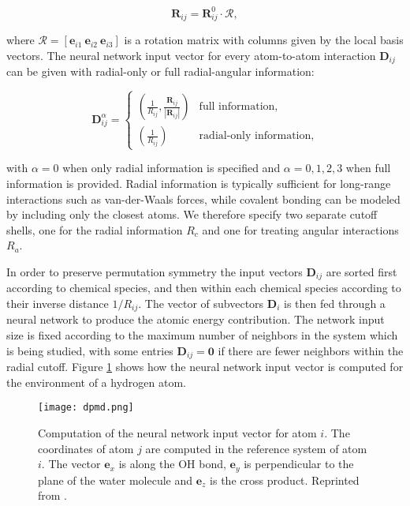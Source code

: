 \begin{equation}
    \bm{R}_{ij} = \bm{R}_{ij}^0 \cdot \mathcal{R} ,
\end{equation}

where $\mathcal{R} = [\bm{e}_{i1} \ \bm{e}_{i2} \ \bm{e}_{i3}]$
is a rotation matrix with columns given by the local basis vectors.
The neural network input vector for every atom-to-atom interaction
$\bm{D}_{ij}$ can be given with radial-only or full radial-angular
information:

\begin{equation}
    \bm{D}_{ij}^{\alpha} =
\begin{cases}
    \displaystyle\left( \frac{1}{R_{ij}}, \frac{\bm{R}_{ij}}{\left| \bm{R}_{ij} \right|}
    \right) & \text{full information}, \\[10pt]
    \displaystyle\left( \frac{1}{R_{ij}} \right) & \text{radial-only information},
\end{cases}
\end{equation}

with $\alpha = 0$ when only radial information is specified
and $\alpha = 0,1,2,3$ when full information is provided. Radial information
is typically sufficient for long-range interactions such as van-der-Waals
forces, while covalent bonding can be modeled by including
only the closest atoms. We therefore specify two separate
cutoff shells, one for the radial information $R_c$ and one
for treating angular interactions $R_a$.
\par
In order to preserve permutation symmetry the input vectors $\bm{D}_{ij}$
are sorted first according to chemical species, and then within
each chemical species according to their inverse distance $1 / R_{ij}$.
The vector of subvectors $\bm{D}_i$ is then fed through a neural
network to produce the atomic energy contribution.
The network input size is fixed according to the maximum number of neighbors
in the system which is being studied, with some entries $\bm{D}_{ij} = \bm{0}$
if there are fewer neighbors within the radial cutoff.
Figure \ref{fig:dpmd} shows how the neural network input vector
is computed for the environment of a hydrogen atom.

\begin{figure}[H]
    \centering
    \texttt{[image: dpmd.png]}
    \caption{Computation of the neural network input vector for atom $i$.
        The coordinates of atom $j$ are computed in the reference system of atom $i$.
        The vector $\bm{e}_x$ is along the OH bond, $\bm{e}_y$ is perpendicular
        to the plane of the water molecule and $\bm{e}_z$ is the cross product.
        Reprinted from \parencite[Zhang et al.]{PhysRevLett.120.143001}.}
    \label{fig:dpmd}
\end{figure}


